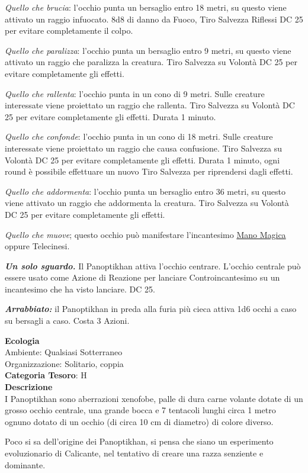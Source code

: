 \begin{multicols}{2}
{\emph{Quello che brucia}: l'occhio punta un bersaglio entro 18 metri, su questo viene attivato un raggio infuocato. 8d8 di danno da Fuoco, Tiro Salvezza Riflessi DC 25 per evitare completamente il colpo.

\emph{Quello che paralizza}: l'occhio punta un bersaglio entro 9 metri, su questo viene attivato un raggio che paralizza la creatura. Tiro Salvezza su Volontà DC 25 per evitare completamente gli effetti.

\emph{Quello che rallenta}: l'occhio punta in un cono di 9 metri. Sulle creature interessate viene proiettato un raggio che rallenta. Tiro Salvezza su Volontà DC 25 per evitare completamente gli effetti. Durata 1 minuto.

\emph{Quello che confonde}: l'occhio punta in un cono di 18 metri. Sulle creature interessate viene proiettato un raggio che causa confusione. Tiro Salvezza su Volontà DC 25 per evitare completamente gli effetti. Durata 1 minuto, ogni round è possibile effettuare un nuovo Tiro Salvezza per riprendersi dagli effetti.

\emph{Quello che addormenta}: l'occhio punta un bersaglio entro 36 metri, su questo viene attivato un raggio che addormenta la creatura. Tiro Salvezza su Volontà DC 25 per evitare completamente gli effetti.

\emph{Quello che muove}; questo occhio può manifestare l'incantesimo \hyperlink{Mano Magica}{Mano Magica} oppure Telecinesi.

\emph{\textbf{Un solo sguardo.}} Il Panoptikhan attiva l'occhio centrare. L'occhio centrale può essere usato come Azione di Reazione per lanciare Controincantesimo su un incantesimo che ha visto lanciare. DC 25.

\emph{\textbf{Arrabbiato:}} il Panoptikhan in preda alla furia più cieca attiva 1d6 occhi a caso su bersagli a caso. Costa 3 Azioni.

\textbf{Ecologia}\\
Ambiente: Qualsiasi Sotterraneo\\
Organizzazione: Solitario, coppia\\
\textbf{Categoria Tesoro}: H\\
\textbf{Descrizione}\\
I Panoptikhan sono aberrazioni xenofobe, palle di dura carne volante dotate di un grosso occhio centrale, una grande bocca e 7 tentacoli lunghi circa 1 metro ognuno dotato di un occhio (di circa 10 cm di diametro) di colore diverso.

Poco si sa dell'origine dei Panoptikhan, si pensa che siano un esperimento evoluzionario di Calicante, nel tentativo di creare una razza senziente e dominante.

}
\end{multicols}
